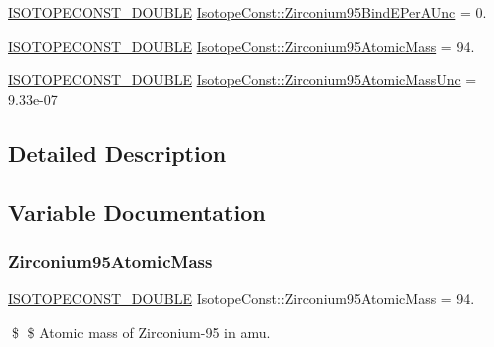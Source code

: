 \begin{DoxyCompactItemize}
\mbox{\hyperlink{group___isotope_const-_macros_ga8f45a7272ce02c0b4c65c44636ed719a}{I\+S\+O\+T\+O\+P\+E\+C\+O\+N\+S\+T\+\_\+\+D\+O\+U\+B\+LE}} \mbox{\hyperlink{group___isotope_const-_zirconium-_zr95_gaa4df9e79d69667f0888159c75c6a3be9}{Isotope\+Const\+::\+Zirconium95\+Bind\+E\+Per\+A\+Unc}} = 0.
\item 
\mbox{\hyperlink{group___isotope_const-_macros_ga8f45a7272ce02c0b4c65c44636ed719a}{I\+S\+O\+T\+O\+P\+E\+C\+O\+N\+S\+T\+\_\+\+D\+O\+U\+B\+LE}} \mbox{\hyperlink{group___isotope_const-_zirconium-_zr95_gade8b412f13385d2024de6d08cab8984e}{Isotope\+Const\+::\+Zirconium95\+Atomic\+Mass}} = 94.
\item 
\mbox{\hyperlink{group___isotope_const-_macros_ga8f45a7272ce02c0b4c65c44636ed719a}{I\+S\+O\+T\+O\+P\+E\+C\+O\+N\+S\+T\+\_\+\+D\+O\+U\+B\+LE}} \mbox{\hyperlink{group___isotope_const-_zirconium-_zr95_gabad984da1d3e3362bbbb1cc93b5d779f}{Isotope\+Const\+::\+Zirconium95\+Atomic\+Mass\+Unc}} = 9.\+33e-\/07
\end{DoxyCompactItemize}


\subsection{Detailed Description}


\subsection{Variable Documentation}
\mbox{\label{group___isotope_const-_zirconium-_zr95_gade8b412f13385d2024de6d08cab8984e}} 
\subsubsection{\texorpdfstring{Zirconium95\+Atomic\+Mass}{Zirconium95AtomicMass}}
{\footnotesize\ttfamily \mbox{\hyperlink{group___isotope_const-_macros_ga8f45a7272ce02c0b4c65c44636ed719a}{I\+S\+O\+T\+O\+P\+E\+C\+O\+N\+S\+T\+\_\+\+D\+O\+U\+B\+LE}} Isotope\+Const\+::\+Zirconium95\+Atomic\+Mass = 94.}

\$ \$ Atomic mass of Zirconium-\/95 in amu. \mbox{\label{group___isotope_const-_zirconium-_zr95_gabad984da1d3e3362bbbb1cc93b5d779f}} 
